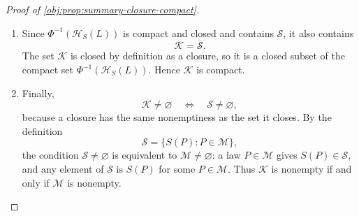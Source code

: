\documentclass[11pt]{article}
\begin{document}
\begin{proof}[Proof of \cref{obj:prop:summary-closure-compact}]
\begin{enumerate}
\item Since \(\Phi^{-1}(\mathcal H_S(L))\) is compact and closed and contains \(\mathscr S\), it also contains
\[
        \mathcal K=\overline{\mathscr S}.
\]
The set \(\mathcal K\) is closed by definition as a closure, so it is a closed subset of the compact set \(\Phi^{-1}(\mathcal H_S(L))\).  Hence \(\mathcal K\) is compact. %

\item Finally,
\[
        \mathcal K\neq\varnothing
        \quad\Longleftrightarrow\quad
        \mathscr S\neq\varnothing,
\]
because a closure has the same nonemptiness as the set it closes.  By the definition
\[
        \mathscr S=\{S(P):P\in\mathcal M\},
\]
the condition \(\mathscr S\neq\varnothing\) is equivalent to \(\mathcal M\neq\varnothing\): a law \(P\in\mathcal M\) gives \(S(P)\in\mathscr S\), and any element of \(\mathscr S\) is \(S(P)\) for some \(P\in\mathcal M\).  Thus \(\mathcal K\) is nonempty if and only if \(\mathcal M\) is nonempty. %
\end{enumerate}
\end{proof}
\end{document}
